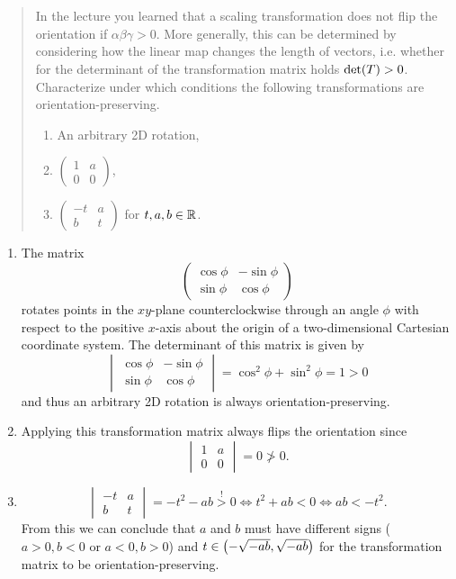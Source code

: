 \documentclass[english]{exercise}
\begin{document}
	\section{}

	\begin{quote}
		In the lecture you learned that a scaling transformation does not flip the orientation if \(\alpha\beta\gamma > 0\).
		More generally, this can be determined by considering how the linear map changes the length of vectors, i.e. whether for the determinant of the transformation matrix holds \(\det\parentheses*{T} > 0\).
		Characterize under which conditions the following transformations are orientation-preserving.
		\begin{enumerate}
			\item An arbitrary 2D rotation,
			\item \(\begin{pmatrix}
				1 & a\\
				0 & 0
			\end{pmatrix}\),
			\item \(\begin{pmatrix}
				-t & a\\
				b & t
			\end{pmatrix}\) for \(t, a, b \in \R\).
		\end{enumerate}
	\end{quote}

	\begin{enumerate}
		\item The matrix
		\[
			\begin{pmatrix}
				\cos\phi & -\sin\phi\\
				\sin\phi & \cos\phi
			\end{pmatrix}
		\]
		rotates points in the \(xy\)-plane counterclockwise through an angle \(\phi\) with respect to the positive \(x\)-axis about the origin of a two-dimensional Cartesian coordinate system.
		The determinant of this matrix is given by
		\[
			\begin{vmatrix}
				\cos\phi & -\sin\phi\\
				\sin\phi & \cos\phi
			\end{vmatrix} = \cos^2 \phi + \sin^2 \phi = 1 > 0
		\]
		and thus an arbitrary 2D rotation is always orientation-preserving.
		\item Applying this transformation matrix always flips the orientation since
		\[
			\begin{vmatrix}
				1 & a\\
				0 & 0
			\end{vmatrix} = 0 \not> 0.
		\]
		\item
		\[
			\begin{vmatrix}
				-t & a\\
				b & t
			\end{vmatrix} = -t^2 - ab \stackrel{!}{>} 0 \iff t^2 + ab < 0 \iff ab < -t^2.
		\]
		From this we can conclude that \(a\) and \(b\) must have different signs (\(a > 0, b < 0\) or \(a < 0, b > 0\)) and \(t \in \parentheses*{-\sqrt{-ab}, \sqrt{-ab}}\) for the transformation matrix to be orientation-preserving.
	\end{enumerate}
\end{document}
